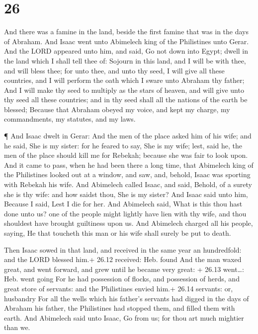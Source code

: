 \hypertarget{section-25}{%
\section{26}\label{section-25}}

 And there was a famine in the land, beside the first famine
that was in the days of Abraham. And Isaac went unto Abimelech king of
the Philistines unto Gerar.  And the LORD appeared unto him,
and said, Go not down into Egypt; dwell in the land which I shall tell
thee of:  Sojourn in this land, and I will be with thee, and
will bless thee; for unto thee, and unto thy seed, I will give all these
countries, and I will perform the oath which I sware unto Abraham thy
father;  And I will make thy seed to multiply as the stars
of heaven, and will give unto thy seed all these countries; and in thy
seed shall all the nations of the earth be blessed;  Because
that Abraham obeyed my voice, and kept my charge, my commandments, my
statutes, and my laws.

 ¶ And Isaac dwelt in Gerar:  And the men of the
place asked him of his wife; and he said, She is my sister: for he
feared to say, She is my wife; lest, said he, the men of the place
should kill me for Rebekah; because she was fair to look upon.
 And it came to pass, when he had been there a long time,
that Abimelech king of the Philistines looked out at a window, and saw,
and, behold, Isaac was sporting with Rebekah his wife.  And
Abimelech called Isaac, and said, Behold, of a surety she is thy wife:
and how saidst thou, She is my sister? And Isaac said unto him, Because
I said, Lest I die for her.  And Abimelech said, What is
this thou hast done unto us? one of the people might lightly have lien
with thy wife, and thou shouldest have brought guiltiness upon us.
 And Abimelech charged all his people, saying, He that
toucheth this man or his wife shall surely be put to death.

 Then Isaac sowed in that land, and received in the same
year an hundredfold: and the LORD blessed him.+ 26.12 received: Heb.
found  And the man waxed great, and went forward, and grew
until he became very great: + 26.13 went\ldots: Heb. went going
 For he had possession of flocks, and possession of herds,
and great store of servants: and the Philistines envied him.+ 26.14
servants: or, husbandry  For all the wells which his
father's servants had digged in the days of Abraham his father, the
Philistines had stopped them, and filled them with earth. 
And Abimelech said unto Isaac, Go from us; for thou art much mightier
than we.

